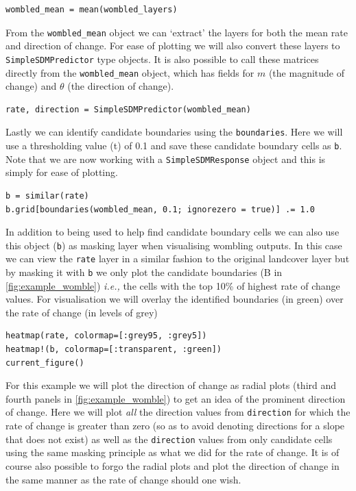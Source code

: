 \begin{refsection}
\begin{verbatim}
wombled_mean = mean(wombled_layers)
\end{verbatim}

From the \texttt{wombled\_mean} object we can `extract' the layers for
both the mean rate and direction of change. For ease of plotting we will
also convert these layers to \texttt{SimpleSDMPredictor} type objects.
It is also possible to call these matrices directly from the
\texttt{wombled\_mean} object, which has fields for \(m\) (the magnitude
of change) and \(\theta\) (the direction of change).

\begin{verbatim}
rate, direction = SimpleSDMPredictor(wombled_mean)
\end{verbatim}

Lastly we can identify candidate boundaries using the
\texttt{boundaries}. Here we will use a thresholding value (t) of 0.1
and save these candidate boundary cells as \texttt{b}. Note that we are
now working with a \texttt{SimpleSDMResponse} object and this is simply
for ease of plotting.

\begin{verbatim}
b = similar(rate)
b.grid[boundaries(wombled_mean, 0.1; ignorezero = true)] .= 1.0
\end{verbatim}

In addition to being used to help find candidate boundary cells we can
also use this object (\texttt{b}) as masking layer when visualising
wombling outputs. In this case we can view the \texttt{rate} layer in a
similar fashion to the original landcover layer but by masking it with
\texttt{b} we only plot the candidate boundaries (B in \autoref{fig:example_womble})
\emph{i.e.,} the cells with the top 10\% of highest rate of change
values. For visualisation we will overlay the identified boundaries (in
green) over the rate of change (in levels of grey)

\begin{verbatim}
heatmap(rate, colormap=[:grey95, :grey5])
heatmap!(b, colormap=[:transparent, :green])
current_figure()
\end{verbatim}

For this example we will plot the direction of change as radial plots
(third and fourth panels in \autoref{fig:example_womble}) to get an idea of the
prominent direction of change. Here we will plot \emph{all} the
direction values from \texttt{direction} for which the rate of change is
greater than zero (so as to avoid denoting directions for a slope that
does not exist) as well as the \texttt{direction} values from only
candidate cells using the same masking principle as what we did for the
rate of change. It is of course also possible to forgo the radial plots
and plot the direction of change in the same manner as the rate of
change should one wish.


\end{refsection}
